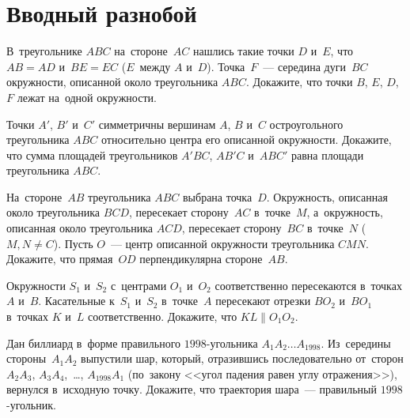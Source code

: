 
\section*{Вводный разнобой}


\begin{problems}

\item
В~треугольнике $ABC$ на~стороне~$AC$ нашлись такие точки $D$ и~$E$, что
$AB = AD$ и~$BE = EC$ ($E$~между $A$ и~$D$).
Точка~$F$~--- середина дуги~$BC$ окружности, описанной около
треугольника $ABC$.
Докажите, что точки $B$, $E$, $D$, $F$ лежат на~одной окружности.

\item
Точки $A'$, $B'$ и~$C'$ симметричны вершинам $A$, $B$ и~$C$ остроугольного
треугольника $ABC$ относительно центра его описанной окружности.
Докажите, что сумма площадей треугольников $A'BC$, $AB'C$ и~$ABC'$ равна
площади треугольника $ABC$.

\item
На~стороне~$AB$ треугольника $ABC$ выбрана точка~$D$.
Окружность, описанная около треугольника $BCD$, пересекает сторону~$AC$
в~точке~$M$, а~окружность, описанная около треугольника $ACD$, пересекает
сторону~$BC$ в~точке~$N$ ($M, N \neq C$).
Пусть $O$~--- центр описанной окружности треугольника $CMN$.
Докажите, что прямая~$OD$ перпендикулярна стороне~$AB$.

\item
Окружности $S_1$ и~$S_2$ с~центрами $O_1$ и~$O_2$ соответственно пересекаются
в~точках $A$ и~$B$.
Касательные к~$S_1$ и~$S_2$ в~точке~$A$ пересекают отрезки $B O_2$ и~$B O_1$
в~точках $K$ и~$L$ соответственно.
Докажите, что $KL \parallel O_1 O_2$.

\item
Дан биллиард в~форме правильного $1998$-угольника
$A_{1} A_{2} \ldots A_{1998}$.
Из~середины стороны~$A_1 A_2$ выпустили шар, который, отразившись
последовательно от~сторон
$A_{2} A_{3}$, $A_{3} A_{4}$,~\ldots, $A_{1998} A_{1}$
(по~закону <<угол падения равен углу отражения>>), вернулся в~исходную точку.
Докажите, что траектория шара~--- правильный $1998$-угольник.


\end{problems}
